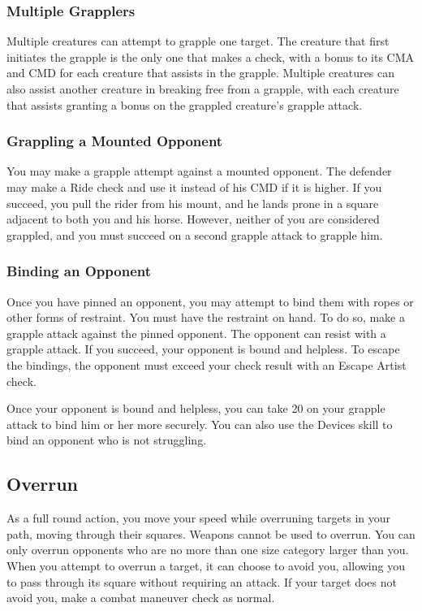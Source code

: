 \subsubsection{Multiple Grapplers}
Multiple creatures can attempt to grapple one target. The creature that first initiates the grapple is the only one that makes a check, with a  bonus to its CMA and CMD for each creature that assists in the grapple. Multiple creatures can also assist another creature in breaking free from a grapple, with each creature that assists granting a  bonus on the grappled creature's grapple attack.

\subsubsection{Grappling a Mounted Opponent}
You may make a grapple attempt against a mounted opponent. The defender may make a Ride check and use it instead of his CMD if it is higher. If you succeed, you pull the rider from his mount, and he lands prone in a square adjacent to both you and his horse. However, neither of you are considered grappled, and you must succeed on a second grapple attack to grapple him.

\subsubsection{Binding an Opponent}
Once you have pinned an opponent, you may attempt to bind them with ropes or other forms of restraint. You must have the restraint on hand. To do so, make a grapple attack against the pinned opponent. The opponent can resist with a grapple attack. If you succeed, your opponent is bound and helpless. To escape the bindings, the opponent must exceed your check result with an Escape Artist check.

Once your opponent is bound and helpless, you can take 20 on your grapple attack to bind him or her more securely. You can also use the Devices skill to bind an opponent who is not struggling.

\subsection{Overrun}
As a full round action, you move your speed while overruning targets in your path, moving through their squares. Weapons cannot be used to overrun. You can only overrun opponents who are no more than one size category larger than you. When you attempt to overrun a target, it can choose to avoid you, allowing you to pass through its square without requiring an attack. If your target does not avoid you, make a combat maneuver check as normal.

